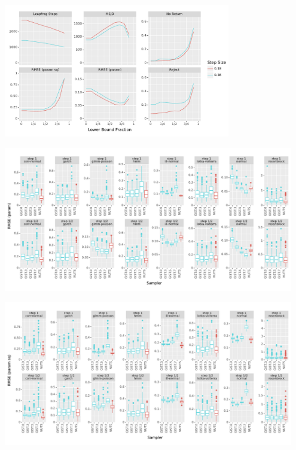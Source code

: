 \documentclass[10pt]{report}
\begin{document}
\vspace*{-9pt}
\begin{center}
  \includegraphics[width=3.9in]{img/uniform_prob_steps_plot.pdf}
\end{center}

\vspace*{-9pt}
\begin{center}
  \includegraphics[width=0.95\textwidth]{img/vs_NUTS_rmse_param.pdf}
\end{center}

\vspace*{-9pt}
\begin{center}
  \includegraphics[width=0.95\textwidth]{img/vs_NUTS_rmse_param_sq.pdf}
\end{center}
\end{document}
